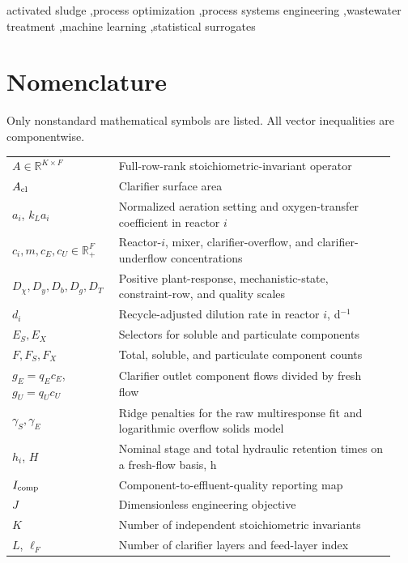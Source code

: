 \documentclass[a4paper,fleqn]{cas-sc}
\newcommand{\R}{\mathbb{R}}
\begin{document}
\begin{keywords}
activated sludge \sep process optimization \sep process systems engineering \sep wastewater treatment \sep machine learning \sep statistical surrogates
\end{keywords}

\maketitle

\section*{Nomenclature}
\noindent Only nonstandard mathematical symbols are listed. All vector inequalities are componentwise.
\begin{longtable}{p{0.25\linewidth}p{0.69\linewidth}}
$A\in\R^{K\times F}$ & Full-row-rank stoichiometric-invariant operator\\
$A_{\rm cl}$ & Clarifier surface area\\
$a_i$, $k_La_i$ & Normalized aeration setting and oxygen-transfer coefficient in reactor $i$\\
$c_i,m,c_E,c_U\in\R_+^F$ & Reactor-$i$, mixer, clarifier-overflow, and clarifier-underflow concentrations\\
$D_\chi,D_y,D_b,D_g,D_T$ & Positive plant-response, mechanistic-state, constraint-row, and quality scales\\
$d_i$ & Recycle-adjusted dilution rate in reactor $i$, d$^{-1}$\\
$E_S,E_X$ & Selectors for soluble and particulate components\\
$F,F_S,F_X$ & Total, soluble, and particulate component counts\\
$g_E=q_Ec_E$, $g_U=q_Uc_U$ & Clarifier outlet component flows divided by fresh flow\\
$\gamma_S,\gamma_E$ & Ridge penalties for the raw multiresponse fit and logarithmic overflow solids model\\
$h_i$, $H$ & Nominal stage and total hydraulic retention times on a fresh-flow basis, h\\
$I_{\rm comp}$ & Component-to-effluent-quality reporting map\\
$J$ & Dimensionless engineering objective\\
$K$ & Number of independent stoichiometric invariants\\
$L$, $\ell_F$ & Number of clarifier layers and feed-layer index\\

\end{longtable}
\end{document}
